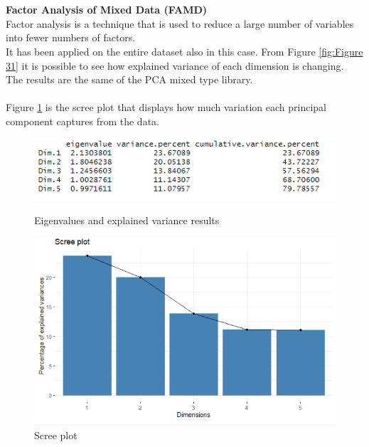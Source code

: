 \documentclass{FR16}
\begin{document}
\noindent 
\\\\
\textbf{Factor Analysis of Mixed Data (FAMD)}\\
Factor analysis is a technique that is used to reduce a large number of variables into fewer numbers of factors. 
\\
It has been applied on the entire dataset also in this case. From Figure \ref{fig:Figure 31} it is possible to see how explained variance of each dimension is changing. The results are the same of the PCA mixed type library. 
\\\\
\noindent Figure \ref{fig:32} is the scree plot that displays how much variation each principal component captures from the data.

\begin{figure}[!htb]
   \begin{minipage}{0.48\textwidth}
     \centering
    \includegraphics[width=1\textwidth]{figures/FAMD.PNG} 
 \caption{\label{fig:31} Eigenvalues and explained variance results}
   \end{minipage}\hfill
   \begin{minipage}{0.48\textwidth}
     \centering
       \includegraphics[width=1\textwidth]{figures/FAMD2.PNG} 
 \caption{\label{fig:32} Scree plot }
   \end{minipage}
   
\end{figure}
\end{document}
